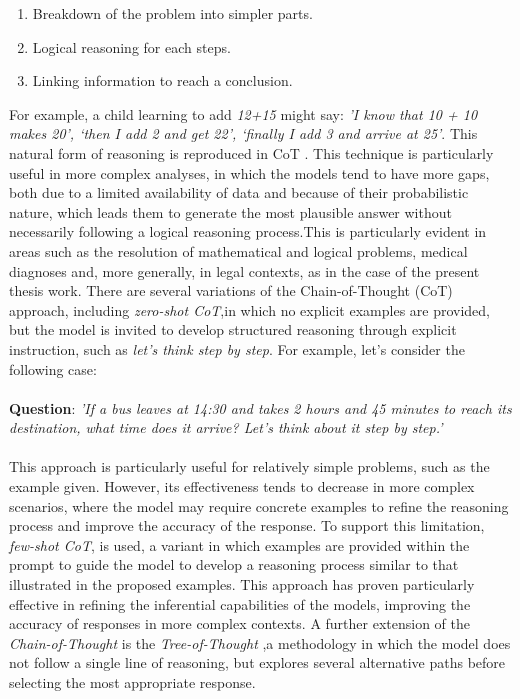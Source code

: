 \begin{enumerate}
    \item Breakdown of the problem into simpler parts.
    \item Logical reasoning for each steps.
    \item Linking information to reach a conclusion.
\end{enumerate}
For example, a child learning to add \textit{12+15} might say: \textit{'I know that 10 + 10 makes 20’, ‘then I add 2 and get 22’, ‘finally I add 3 and arrive at 25'}.
This natural form of reasoning is reproduced in CoT \cite{Cot}. 
This technique is particularly useful in more complex analyses, in which the models tend to have more gaps, both due to a limited availability of data and because of their probabilistic nature, which leads them to generate the most plausible answer without necessarily following a logical reasoning process.This is particularly evident in areas such as the resolution of mathematical and logical problems, medical diagnoses and, more generally, in legal contexts, as in the case of the present thesis work.
There are several variations of the Chain-of-Thought (CoT) approach, including \textit{zero-shot CoT},in which no explicit examples are provided, but the model is invited to develop structured reasoning through explicit instruction, such as \textit{let's think step by step}. 
For example, let's consider the following case:\\
\\
\textbf{Question}: \textit{'If a bus leaves at 14:30 and takes 2 hours and 45 minutes to reach its destination, what time does it arrive? Let's think about it step by step.'}\\
\\
This approach is particularly useful for relatively simple problems, such as the example given. However, its effectiveness tends to decrease in more complex scenarios, where the model may require concrete examples to refine the reasoning process and improve the accuracy of the response.
To support this limitation, \textit{few-shot CoT},  is used, a variant in which examples are provided within the prompt to guide the model to develop a reasoning process similar to that illustrated in the proposed examples. This approach has proven particularly effective in refining the inferential capabilities of the models, improving the accuracy of responses in more complex contexts.
A further extension of the \textit{Chain-of-Thought} is the \textit{Tree-of-Thought} \cite{ToT},a methodology in which the model does not follow a single line of reasoning, but explores several alternative paths before selecting the most appropriate response.
